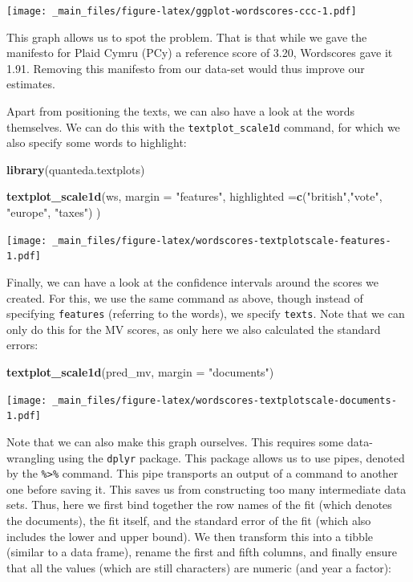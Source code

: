\documentclass[
]{book}
\newenvironment{Shaded}{\begin{snugshade}}{\end{snugshade}}
\newcommand{\AttributeTok}[1]{\textcolor[rgb]{0.13,0.29,0.53}{#1}}
\newcommand{\FunctionTok}[1]{\textcolor[rgb]{0.13,0.29,0.53}{\textbf{#1}}}
\newcommand{\NormalTok}[1]{#1}
\newcommand{\StringTok}[1]{\textcolor[rgb]{0.31,0.60,0.02}{#1}}
\begin{document}
\texttt{[image: \_main\_files/figure-latex/ggplot-wordscores-ccc-1.pdf]}

This graph allows us to spot the problem. That is that while we gave the manifesto for Plaid Cymru (PCy) a reference score of 3.20, Wordscores gave it 1.91. Removing this manifesto from our data-set would thus improve our estimates.

Apart from positioning the texts, we can also have a look at the words themselves. We can do this with the \texttt{textplot\_scale1d} command, for which we also specify some words to highlight:

\begin{Shaded}
\begin{Highlighting}[]
\FunctionTok{library}\NormalTok{(quanteda.textplots)}

\FunctionTok{textplot\_scale1d}\NormalTok{(ws, }
                 \AttributeTok{margin =} \StringTok{"features"}\NormalTok{, }
                 \AttributeTok{highlighted =}\FunctionTok{c}\NormalTok{(}\StringTok{"british"}\NormalTok{,}\StringTok{"vote"}\NormalTok{, }\StringTok{"europe"}\NormalTok{, }\StringTok{"taxes"}\NormalTok{)}
\NormalTok{                 )}
\end{Highlighting}
\end{Shaded}

\texttt{[image: \_main\_files/figure-latex/wordscores-textplotscale-features-1.pdf]}

Finally, we can have a look at the confidence intervals around the scores we created. For this, we use the same command as above, though instead of specifying \texttt{features} (referring to the words), we specify \texttt{texts}. Note that we can only do this for the MV scores, as only here we also calculated the standard errors:

\begin{Shaded}
\begin{Highlighting}[]
\FunctionTok{textplot\_scale1d}\NormalTok{(pred\_mv, }\AttributeTok{margin =} \StringTok{"documents"}\NormalTok{)}
\end{Highlighting}
\end{Shaded}

\texttt{[image: \_main\_files/figure-latex/wordscores-textplotscale-documents-1.pdf]}

Note that we can also make this graph ourselves. This requires some data-wrangling using the \texttt{dplyr} package. This package allows us to use pipes, denoted by the \texttt{\%\textgreater{}\%} command. This pipe transports an output of a command to another one before saving it. This saves us from constructing too many intermediate data sets. Thus, here we first bind together the row names of the fit (which denotes the documents), the fit itself, and the standard error of the fit (which also includes the lower and upper bound). We then transform this into a tibble (similar to a data frame), rename the first and fifth columns, and finally ensure that all the values (which are still characters) are numeric (and year a factor):
\end{document}
